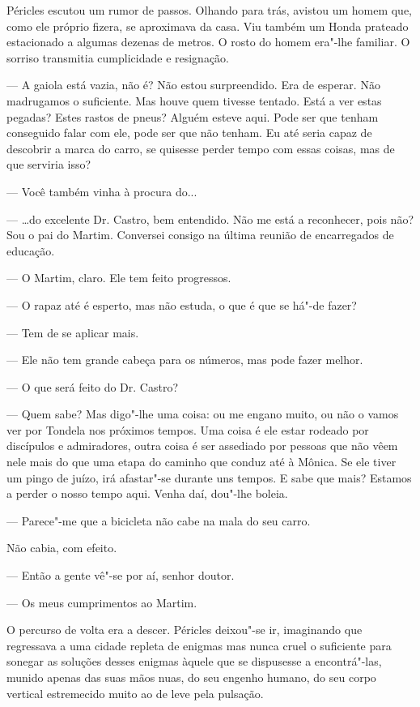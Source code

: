 Péricles escutou um rumor de passos. Olhando para trás, avistou um homem
que, como ele próprio fizera, se aproximava da casa. Viu também um
Honda prateado estacionado a algumas dezenas de metros. O rosto do homem
era"-lhe familiar. O sorriso transmitia cumplicidade e resignação.

--- A gaiola está vazia, não é? Não estou surpreendido. Era de esperar.
  Não madrugamos o suficiente. Mas houve quem tivesse tentado. Está a
  ver estas pegadas? Estes rastos de pneus? Alguém esteve aqui. Pode ser
  que tenham conseguido falar com ele, pode ser que não tenham. Eu até
  seria capaz de descobrir a marca do carro, se quisesse perder tempo
  com essas coisas, mas de que serviria isso?

--- Você também vinha à procura do...

--- \ldots{}do excelente Dr. Castro, bem entendido. Não me
está a reconhecer, pois não? Sou o pai do Martim. Conversei consigo na
última reunião de encarregados de educação.

--- O Martim, claro. Ele tem feito progressos.

--- O rapaz até é esperto, mas não estuda, o que é que se há"-de fazer?

--- Tem de se aplicar mais.

--- Ele não tem grande cabeça para os números, mas pode fazer melhor.

--- O que será feito do Dr. Castro?

--- Quem sabe? Mas digo"-lhe uma coisa: ou me engano muito, ou não o vamos
  ver por Tondela nos próximos tempos. Uma coisa é ele estar rodeado por
  discípulos e admiradores, outra coisa é ser assediado por pessoas que
  não vêem nele mais do que uma etapa do caminho que conduz até à
  Mônica. Se ele tiver um pingo de juízo, irá afastar"-se durante uns
  tempos. E sabe que mais? Estamos a perder o nosso tempo aqui. Venha
  daí, dou"-lhe boleia.

--- Parece"-me que a bicicleta não cabe na mala do seu carro.


Não cabia, com efeito.

--- Então a gente vê"-se por aí, senhor doutor.

--- Os meus cumprimentos ao Martim.


O percurso de volta era a descer. Péricles deixou"-se ir, imaginando
que regressava a uma cidade repleta de enigmas mas nunca cruel o
suficiente para sonegar as soluções desses enigmas àquele que se
dispusesse a encontrá"-las, munido apenas das suas mãos nuas, do seu
engenho humano, do seu corpo vertical estremecido muito ao de leve pela
pulsação.

